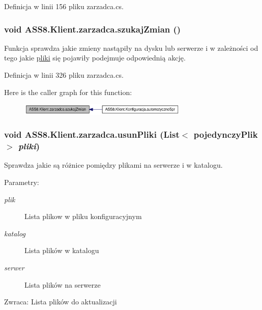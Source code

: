 Definicja w linii 156 pliku zarzadca.cs.\hypertarget{a00037_23c6a981e5d8340c7207a7cbbd5d710e}{
\subsubsection[{szukajZmian}]{\setlength{\rightskip}{0pt plus 5cm}void ASS8.Klient.zarzadca.szukajZmian ()}}
\label{d1/dc6/a00037_23c6a981e5d8340c7207a7cbbd5d710e}


Funkcja sprawdza jakie zmieny nastąpiły na dysku lub serwerze i w zależności od tego jakie \hyperlink{a00017}{pliki} się pojawiły podejmuje odpowiednią akcję. 



Definicja w linii 326 pliku zarzadca.cs.

Here is the caller graph for this function:\nopagebreak
\begin{figure}[H]
\begin{center}
\leavevmode
\includegraphics[width=229pt]{d1/dc6/a00037_23c6a981e5d8340c7207a7cbbd5d710e_icgraph}
\end{center}
\end{figure}
\hypertarget{a00037_8c6fafc63cea03167c3cac60d6ebf3a3}{
\subsubsection[{usunPliki}]{\setlength{\rightskip}{0pt plus 5cm}void ASS8.Klient.zarzadca.usunPliki (List$<$ {\bf pojedynczyPlik} $>$ {\em pliki})}}
\label{d1/dc6/a00037_8c6fafc63cea03167c3cac60d6ebf3a3}


Sprawdza jakie są różnice pomiędzy plikami na serwerze i w katalogu. 

\begin{Desc}
\item[Parametry:]
\begin{description}
\item[{\em plik}]Lista plikow w pliku konfiguracyjnym\item[{\em katalog}]Lista plików w katalogu\item[{\em serwer}]Lista plików na serwerze\end{description}
\end{Desc}
\begin{Desc}
\item[Zwraca:]Lista plików do aktualizacji\end{Desc}


